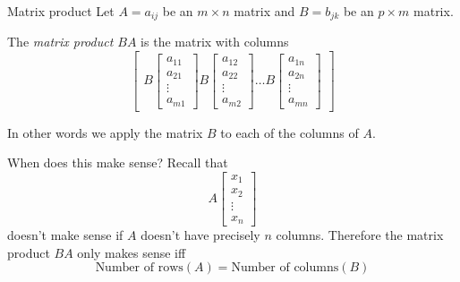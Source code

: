 \documentclass{beamer}
\begin{document}
\begin{frame}{Matrix product}
  Let $A= a_{ij}$ be an $m\times n$ matrix and $B=b_{jk}$ be an $p\times m$ matrix.\vfill
  \begin{definition}
    The \emph{matrix product $BA$} is the matrix with columns
    \begin{equation*}
      \left[
      \begin{array}{ccccc}
        B\left[\begin{array}{c} a_{11} \\ a_{21} \\ \vdots \\a_{m1}\end{array} \right] B\left[\begin{array}{c} a_{12} \\ a_{22} \\ \vdots \\a_{m2}\end{array} \right] \dots B\left[\begin{array}{c} a_{1n} \\ a_{2n} \\ \vdots \\a_{mn}\end{array} \right]
      \end{array}\right]
    \end{equation*}
  \end{definition}\vfill
  In other words we apply the matrix $B$ to each of the columns of $A$.
\end{frame}

\begin{frame}{When does this make sense?}
Recall that
    \begin{equation*}
      A \left[\begin{array}{c} x_1 \\ x_2 \\ \vdots \\ x_n\end{array} \right]
    \end{equation*}
    doesn't make sense if $A$ doesn't have precisely $n$ columns.\vfill
   Therefore the matrix product $BA$ only makes sense iff
    \begin{equation*}
      \text{Number of rows}(A) = \text{Number of columns}(B)
    \end{equation*}
\end{frame}
\end{document}
